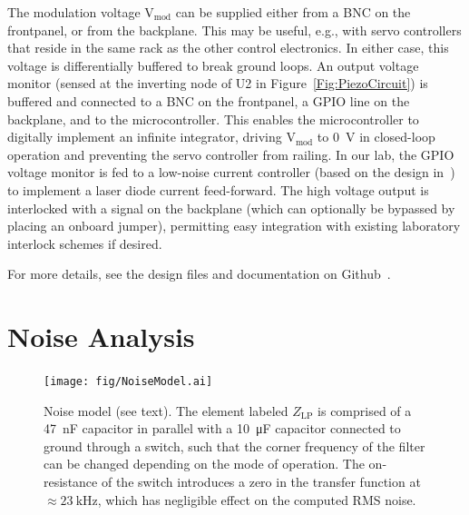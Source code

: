 \documentclass[aip,rsi,reprint]{revtex4-1} %
\begin{document}
The modulation voltage $\text{V}_\text{mod}$ can be supplied either from a BNC on the frontpanel, or from the backplane.
This may be useful, e.g., with servo controllers that reside in the same rack as the other control electronics.
In either case, this voltage is differentially buffered to break ground loops.
An output voltage monitor (sensed at the inverting node of U2 in Figure~\ref{Fig:PiezoCircuit}) is buffered and connected to a BNC on the frontpanel, a GPIO line on the backplane, and to the microcontroller.
This enables the microcontroller to digitally implement an infinite integrator, driving $\text{V}_\text{mod}$ to \SI{0}{\volt} in closed-loop operation and preventing the servo controller from railing.
In our lab, the GPIO voltage monitor is fed to a low-noise current controller (based on the design in~\cite{Erickson2008a}) to implement a laser diode current feed-forward.
The high voltage output is interlocked with a signal on the backplane (which can optionally be bypassed by placing an onboard jumper), permitting easy integration with existing laboratory interlock schemes if desired.

For more details, see the design files and documentation on Github~\cite{DesignFiles}.

\section{Noise Analysis}
\label{Sec:NoiseAnalysis}

\begin{figure}[t]
\texttt{[image: fig/NoiseModel.ai]}
\caption{Noise model (see text). The element labeled $Z_\text{LP}$ is comprised of a \SI{47}{\nano\farad} capacitor in parallel with a \SI{10}{\micro\farad} capacitor connected to ground through a switch, such that the corner frequency of the filter can be changed depending on the mode of operation. The on-resistance of the switch introduces a zero in the transfer function at $\approx\SI{23}{\kilo\hertz}$, which has negligible effect on the computed RMS noise. \label{Fig:NoiseModel}}
\end{figure}
\end{document}
